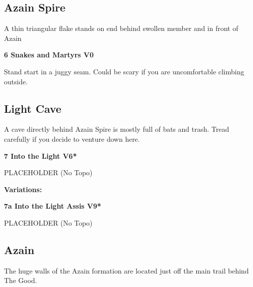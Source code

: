 \begin{multicols}{2}
\needspace{1.5cm}
\subsection*{Azain Spire}\label{bf:Azain Spire}
A thin triangular flake stands on end behind swollen member and in front of Azain\\
	


\needspace{1.5cm}
\label{rt:Snakes and Martyrs}
\colorbox{green!20}{
\parbox{0.95\linewidth}{
\textbf{
6 Snakes and Martyrs V0  
}}}

\begin{adjustwidth}{0.5cm}{}			
 Stand start in a juggy seam. Could be scary if you are uncomfortable climbing outside.
\end{adjustwidth}




\needspace{1.5cm}
\subsection*{Light Cave}\label{bf:Light Cave}
A cave directly behind Azain Spire is mostly full of bats and trash. Tread carefully if you decide to venture down here.\\
	


\needspace{1.5cm}
\label{rt:Into the Light}
\colorbox{RoyalBlue!20}{
\parbox{0.95\linewidth}{
\textbf{
7 Into the Light V6*  
}}}

\begin{adjustwidth}{0.5cm}{}			
PLACEHOLDER (No Topo)
\end{adjustwidth}

\begin{adjustwidth}{0.5cm}{}				
\needspace{3cm}
\textbf{Variations:} \newline

\needspace{1.5cm}
\label{vr:Into the Light Assis}
\colorbox{Goldenrod!50}{
\parbox{0.95\linewidth}{
\textbf{
7a Into the Light Assis V9*  
}}}

\begin{adjustwidth}{0.5cm}{}			
PLACEHOLDER (No Topo)
\end{adjustwidth}


\end{adjustwidth}



\needspace{1.5cm}
\subsection*{Azain}\label{bf:Azain}
The huge walls of the Azain formation are located just off the main trail behind The Good.\\
	



\end{multicols}
